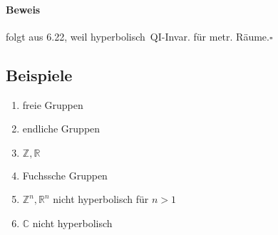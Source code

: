 \documentclass{article}
\newcommand{\Z}{\mathbb{Z}}
\newcommand{\R}{\mathbb{R}}
\newcommand{\C}{\mathbb{C}}
\newcommand{\qed}{\hfill $\square$}
\begin{document}
\paragraph{Beweis} folgt aus 6.22, weil \grqq hyperbolisch\glqq\ QI-Invar. für metr. Räume.\qed

\subsection{Beispiele}
\begin{enumerate}
	\item freie Gruppen
	\item endliche Gruppen
	\item $\Z, \R$
	\item Fuchssche Gruppen
	\item $\Z^n, \R^n$ nicht hyperbolisch für $n > 1$
	\item $\C$ nicht hyperbolisch
\end{enumerate}
\end{document}
